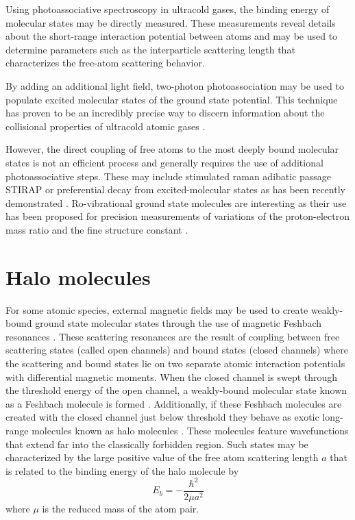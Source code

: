 Using photoassociative spectroscopy in ultracold gases, the binding energy of molecular states may be directly measured.
These measurements reveal details about the short-range interaction potential between atoms and may be used to determine parameters such as the interparticle scattering length that characterizes the free-atom scattering behavior.

By adding an additional light field, two-photon photoassociation may be used to populate excited molecular states of the ground state potential.
This technique has proven to be an incredibly precise way to discern information about the collisional properties of ultracold atomic gases \cite{PhysRevLett.74.1315,MartinezDeEscobar2008, Aman2018}.

However, the direct coupling of free atoms to the most deeply bound molecular states is not an efficient process and generally requires the use of additional photoassociative steps.
These may include stimulated raman adibatic passage STIRAP or preferential decay from excited-molecular states as has been recently demonstrated \cite{Reinaudi2012, cbc17, Stellmer2012, Ciamei2017, RevModPhys.89.015006}.
Ro-vibrational ground state molecules are interesting as their use has been proposed for precision measurements of variations of the proton-electron mass ratio \cite{zky08, Kotochigova2009} and the fine structure constant \cite{Beloy2011}. 


\section{Halo molecules} \label{sec:halo}
For some atomic species, external magnetic fields may be used to create weakly-bound ground state molecular states through the use of magnetic Feshbach resonances \cite{Kohler2006, Chin2010}.
These scattering resonances are the result of coupling between free scattering states (called open channels) and bound states (closed channels) where the scattering and bound states lie on two separate atomic interaction potentials with differential magnetic moments.
When the closed channel is swept through the threshold energy of the open channel, a weakly-bound molecular state known as a Feshbach molecule is formed \cite{cbk03, grj03,hkm03,rtb03,sph03}.
Additionally, if these Feshbach molecules are created with the closed channel just below threshold they behave as exotic long-range molecules known as halo molecules \cite{Kohler2006}.
These molecules feature wavefunctions that extend far into the classically forbidden region.
Such states may be characterized by the large positive value of the free atom scattering length $a$ that is related to the binding energy of the halo molecule by
\begin{equation}
	E_b = -\frac{\hbar^2}{2 \mu a^2}
\end{equation}
where $\mu$ is the reduced mass of the atom pair.

